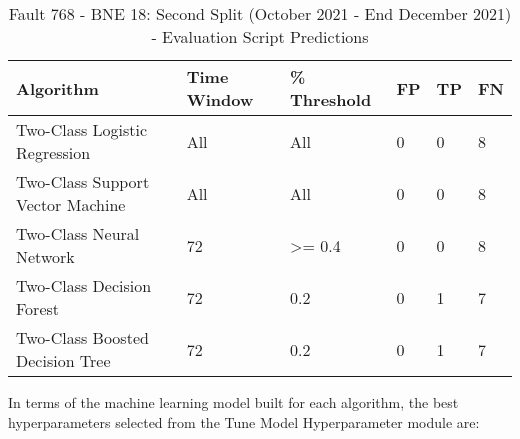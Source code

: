 \begin{table}[!ht]
    \centering
    \begin{tabular}{|l|l|l|l|l|l|}
    \hline
        Algorithm & Time Window & \% Threshold & FP & TP & FN \\ \hline
        Two-Class Logistic Regression & All & All & 0 & 0 & 8 \\ \hline
        Two-Class Support Vector Machine & All & All & 0 & 0 & 8 \\ \hline
        Two-Class Neural Network & 72 & >= 0.4 & 0 & 0 & 8 \\ \hline
        Two-Class Decision Forest & 72 & 0.2 & 0 & 1 & 7 \\ \hline
        Two-Class Boosted Decision Tree & 72 & 0.2 & 0 & 1 & 7 \\ \hline
    \end{tabular}
    \caption{Fault 768 - BNE 18: Second Split (October 2021 - End December 2021) - Evaluation Script Predictions}
    \label{9112_SCA34_1st}
\end{table}

In terms of the machine learning model built for each algorithm, the best hyperparameters selected from the Tune Model Hyperparameter module are:

